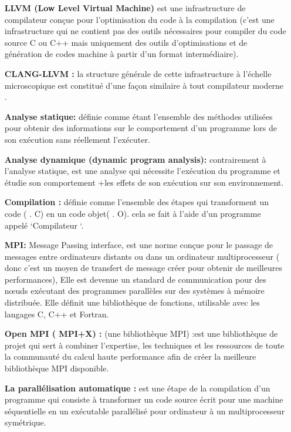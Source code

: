 \documentclass[12pt,titlepage]{article}
\begin{document}
\begin{itemize}
	

\item[\textbf{ LLVM (Low Level Virtual Machine)}] est une infrastructure de compilateur conçue pour l'optimisation du code à la compilation (c’est une infrastructure qui ne contient pas des outils nécessaires pour compiler du code source C ou C++ mais uniquement des outils d’optimisations et de génération de codes machine à partir d’un format intermédiaire).
              
\item[\textbf{CLANG-LLVM :}] la structure générale de cette infrastructure à l’échelle microscopique est constitué d’une façon similaire à tout compilateur moderne .

\item[\textbf{ Analyse statique:}] définie comme étant l'ensemble des méthodes utilisées pour obtenir des informations sur le comportement d’un programme lors de son exécution sans réellement l’exécuter.

\item[\textbf{  Analyse dynamique (dynamic program analysis): }] contrairement à l’analyse statique, est une analyse qui nécessite l’exécution du programme et étudie son comportement +les effets de son exécution sur son environnement.

\item[\textbf{ Compilation : }] définie comme l’ensemble des étapes qui transforment un code ( . C) en un code objet( . O). cela se fait à l’aide d’un programme appelé ‘Compilateur ‘.

\item[\textbf{ MPI:}] Message Passing interface, est une norme conçue pour le passage de messages entre ordinateurs distants ou dans un ordinateur multiprocesseur ( donc c’est un moyen de transfert de message créer pour obtenir de meilleures performances), Elle est devenue un standard de communication pour des nœuds exécutant des programmes parallèles sur des systèmes à mémoire distribuée. Elle définit une bibliothèque de fonctions, utilisable avec les langages C, C++ et Fortran.

\item[\textbf{ Open MPI ( MPI+X) :}] (une bibliothèque MPI) :est une bibliothèque de projet qui sert à combiner l'expertise, les techniques et les ressources de toute la communauté du calcul haute performance afin de créer la meilleure bibliothèque MPI disponible.


\item[\textbf{ La parallélisation automatique :}] est une étape de la compilation d'un programme qui consiste à transformer un code source écrit pour une machine séquentielle en un exécutable parallélisé pour ordinateur à un multiprocesseur symétrique.


\end{itemize}
\end{document}
